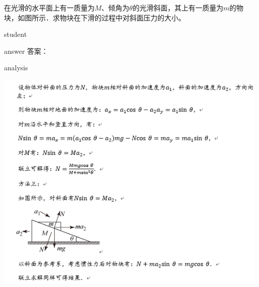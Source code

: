 \begin{example}
	在光滑的水平面上有一质量为$ M $、倾角为$ \theta $的光滑斜面，其上有一质量为$ m $的物块，如图所示．求物块在下滑的过程中对斜面压力的大小。
	
	\begin{taggedblock}{student}
		\vspace*{2cm}
	\end{taggedblock}
	
	
	\begin{taggedblock}{answer}
		答案：
	\end{taggedblock}
	
	
	\begin{taggedblock}{analysis}
		\begin{center}
\includegraphics[width=0.9\linewidth]{image/NIR-14}
\end{center}

		
	\end{taggedblock}
\end{example}

